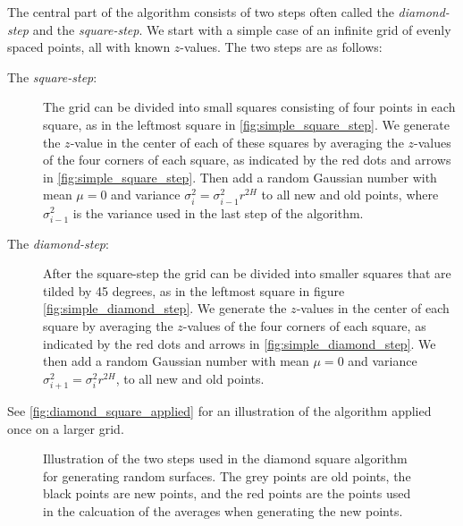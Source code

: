 The central part of the algorithm consists of two steps often called the \emph{diamond-step} and the \emph{square-step}. We start with a simple case of an infinite grid of evenly spaced points, all with known $z$-values. The two steps are as follows:
\begin{description}
    \item[The \emph{square-step}:] The grid can be divided into small squares consisting of four points in each square, as in the leftmost square in \cref{fig:simple_square_step}. We generate the $z$-value in the center of each of these squares by averaging the $z$-values of the four corners of each square, as indicated by the red dots and arrows in \cref{fig:simple_square_step}. Then add a random Gaussian number with mean $\mu = 0$ and variance $\sigma_i^2 = \sigma_{i-1}^2r^{2H}$ to all new and old points, where $\sigma_{i-1}^2$ is the variance used in the last step of the algorithm.
    \label{enum:test}
    
    \item[The \emph{diamond-step}:] After the square-step the grid can be divided into smaller squares that are tilded by 45 degrees, as in the leftmost square in figure \cref{fig:simple_diamond_step}. We generate the $z$-values in the center of each square by averaging the $z$-values of the four corners of each square, as indicated by the red dots and arrows in \cref{fig:simple_diamond_step}. We then add a random Gaussian number with mean $\mu = 0$ and variance $\sigma_{i+1}^2 = \sigma_i^2r^{2H}$, to all new and old points. 
\end{description}
See \cref{fig:diamond_square_applied} for an illustration of the algorithm applied once on a larger grid. 

\begin{figure}
\centering

\setlength{\myfigwidth}{0.5\textwidth}
\setlength{\mycaptionwidth}{0.3\textwidth}

\begin{minipage}[c]{\myfigwidth}
    
\end{minipage}
\begin{minipage}[c]{\mycaptionwidth}
    \label{fig:simple_square_step}
\end{minipage}

\begin{minipage}[c]{\myfigwidth}
    
\end{minipage}
\begin{minipage}[c]{\mycaptionwidth}
    \label{fig:simple_diamond_step}
\end{minipage}

\caption{Illustration of the two steps used in the diamond square algorithm for generating random surfaces. The grey points are old points, the black points are new points, and the red points are the points used in the calcuation of the averages when generating the new points.}
\label{fig:diamond_square_steps}
\end{figure}

